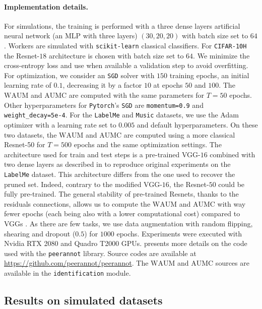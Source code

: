 \paragraph*{Implementation details.}
For simulations, the training is performed with a three dense layers artificial neural network (an MLP with three layers) $(30, 20, 20)$ with batch size set to $64$.
Workers are simulated with \texttt{scikit-learn} \citep{scikit-learn} classical classifiers.
For \texttt{CIFAR-10H} the Resnet-$18$ \citep{he2016deep} architecture is chosen with batch size set to $64$.
We minimize the cross-entropy loss and use when available a validation step to avoid overfitting.
For optimization, we consider an \texttt{SGD} solver with $150$ training epochs, an initial learning rate of $0.1$, decreasing it by a factor $10$ at epochs $50$ and $100$.
The $\mathrm{WAUM}$ and $\mathrm{AUMC}$ are computed with the same parameters for $T=50$ epochs.
Other hyperparameters for \texttt{Pytorch}'s \citep{pytorch} \texttt{SGD} are \texttt{momentum=0.9} and \texttt{weight\_decay=5e-4}.
For the \texttt{LabelMe} and \texttt{Music} datasets, we use the Adam optimizer with a learning rate set to $0.005$ and default hyperparameters.
On these two datasets, the $\mathrm{WAUM}$ and $\mathrm{AUMC}$ are computed using a more classical Resnet-50 for $T=500$ epochs and the same optimization settings.
The architecture used for train and test steps is a pre-trained VGG-$16$ combined with two dense layers as described in \citet{rodrigues2018deep} to reproduce original experiments on the \texttt{LabelMe} dataset.
This architecture differs from the one used to recover the pruned set.
Indeed, contrary to the modified VGG-$16$, the Resnet-$50$ could be fully pre-trained.
The general stability of pre-trained Resnets, thanks to the residuals connections, allows us to compute the $\mathrm{WAUM}$ and $\mathrm{AUMC}$ with way fewer epochs (each being also with a lower computational cost) compared to VGGs \citep{he2016deep}.
As there are few tasks, we use data augmentation with random flipping, shearing and dropout ($0.5$) for $1000$ epochs.
Experiments were executed with Nvidia RTX 2080 and Quadro T2000 GPUs.
 presents more details on the code used with the \texttt{peerannot} library.
Source codes are available at \url{https://github.com/peerannot/peerannot}. The $\mathrm{WAUM}$ and $\mathrm{AUMC}$ sources are available in the \texttt{identification} module.

\subsection{Results on simulated datasets}
\label{subsec:Synthetic_dataset}

